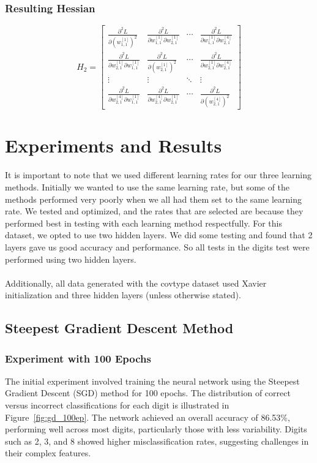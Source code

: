\documentclass{article}
\begin{document}
\subsubsection{Resulting Hessian}
\[
H_2 = \begin{bmatrix}
\frac{\partial^2 L}{\partial (w_{1,1}^{[1]})^2} & \frac{\partial^2 L}{\partial w_{1,1}^{[1]} \partial w_{2,1}^{[1]}} & \cdots & \frac{\partial^2 L}{\partial w_{1,1}^{[1]} \partial w_{2,1}^{[4]}} \\
\frac{\partial^2 L}{\partial w_{2,1}^{[1]} \partial w_{1,1}^{[1]}} & \frac{\partial^2 L}{\partial (w_{2,1}^{[1]})^2} & \cdots & \frac{\partial^2 L}{\partial w_{2,1}^{[1]} \partial w_{2,1}^{[4]}} \\
\vdots & \vdots & \ddots & \vdots \\
\frac{\partial^2 L}{\partial w_{2,1}^{[4]} \partial w_{1,1}^{[1]}} & \frac{\partial^2 L}{\partial w_{2,1}^{[4]} \partial w_{2,1}^{[1]}} & \cdots & \frac{\partial^2 L}{\partial (w_{2,1}^{[4]})^2}
\end{bmatrix}
\]
\section{Experiments and Results}

It is important to note that we used different learning rates for our three learning methods. Initially we wanted to use the same learning rate, but some of the methods performed very poorly when we all had them set to the same learning rate. We tested and optimized, and the rates that are selected are because they performed best in testing with each learning method respectfully. For this dataset, we opted to use two hidden layers. We did some testing and found that 2 layers gave us good accuracy and performance. So all tests in the digits test were performed using two hidden layers. \\ \\
Additionally, all data generated with the covtype dataset used Xavier initialization and three hidden layers (unless otherwise stated).

\subsection{Steepest Gradient Descent Method}

\subsubsection{Experiment with 100 Epochs}
The initial experiment involved training the neural network using the Steepest Gradient Descent (SGD) method for 100 epochs. The distribution of correct versus incorrect classifications for each digit is illustrated in Figure~\ref{fig:gd_100ep}. The network achieved an overall accuracy of 86.53\%, performing well across most digits, particularly those with less variability. Digits such as 2, 3, and 8 showed higher misclassification rates, suggesting challenges in their complex features.
\end{document}
